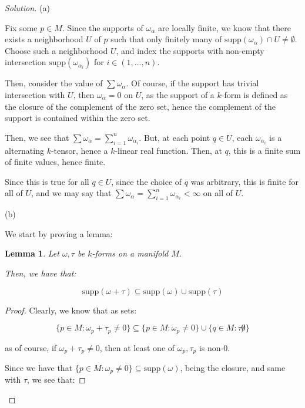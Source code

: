 \documentclass[10pt]{article}
\theoremstyle{nonumberplain}%
\newtheorem*{lemma}{Lemma}
\begin{document}
\begin{proof}[Solution]

(a)

Fix some $p \in M$. Since the supports of $\omega_\alpha$ are locally finite, we know that there exists a neighborhood $U$ of $p$ such that only finitely many of $\text{supp}(\omega_\alpha) \cap U \not = \emptyset$. Choose such a neighborhood $U$, and index the supports with non-empty intersection $\text{supp}(\omega_{\alpha_i})$ for $i \in (1,...,n)$.

Then, consider the value of $\sum \omega_\alpha$. Of course, if the support has trivial intersection with $U$, then $\omega_\alpha = 0$ on $U$, as the support of a $k$-form is defined as the closure of the complement of the zero set, hence the complement of the support is contained within the zero set.

Then, we see that $\sum \omega_\alpha = \sum_{i=1}^n \omega_{\alpha_i}$. But, at each point $q \in U$, each $\omega_{\alpha_i}$ is a alternating $k$-tensor, hence a $k$-linear real function. Then, at $q$, this is a finite sum of finite values, hence finite.

Since this is true for all $q \in U$, since the choice of $q$ was arbitrary, this is finite for all of $U$, and we may say that $\sum \omega_\alpha = \sum_{i=1}^n \omega_{\alpha_i} < \infty$ on all of $U$.

(b)

We start by proving a lemma:

\begin{lemma}
Let $\omega, \tau$ be $k$-forms on a manifold $M$.

Then, we have that:

$$ \text{supp}(\omega + \tau) \subseteq \text{supp}(\omega) \cup \text{supp}(\tau)$$

\end{lemma}

\begin{proof}

Clearly, we know that as sets:

$$ \{ p \in M : \omega_p + \tau_p \not = 0 \} \subseteq \{ p \in M : \omega_p \not = 0 \} \cup \{ q \in M : \tau \not 0 \} $$

as of course, if $\omega_p + \tau_p \not = 0$, then at least one of $\omega_p, \tau_p$ is non-0.

Since we have that $ \{ p \in M : \omega_p \not = 0 \} \subseteq \text{supp}(\omega)$, being the closure, and same with $\tau$, we see that:


\end{proof}
\end{proof}
\end{document}
